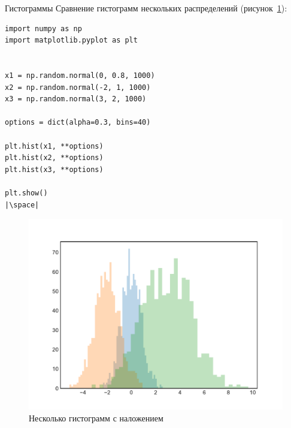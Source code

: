 \documentclass[aspectratio=169, mathserif]{beamer}	%
\begin{document}
\begin{frame}[fragile, label=m]{Гистограммы}
\scriptsize
Сравнение гистограмм нескольких распределений (рисунок~\ref{fig:fig_21}):
\vfill
\begin{minipage}{.4\textwidth}
\begin{verbatim}
import numpy as np
import matplotlib.pyplot as plt


x1 = np.random.normal(0, 0.8, 1000)
x2 = np.random.normal(-2, 1, 1000)
x3 = np.random.normal(3, 2, 1000)

options = dict(alpha=0.3, bins=40)

plt.hist(x1, **options)
plt.hist(x2, **options)
plt.hist(x3, **options)

plt.show()
|\space|
\end{verbatim}
\end{minipage}
\begin{minipage}{.59\textwidth}
\begin{figure}[h!]
	\centering
	\includegraphics[width=.9\linewidth]{./pics/Figure_21}
	\caption{Несколько гистограмм с наложением}
	\label{fig:fig_21}
\end{figure}
\end{minipage}
\vfill
\end{frame}
\end{document}
